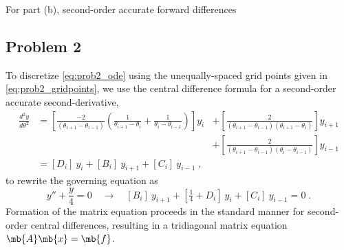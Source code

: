 \documentclass[11pt]{article}
\begin{document}
For part (b), second-order accurate forward differences

\subsection{Problem 2}

To discretize \eqref{eq:prob2_ode} using the unequally-spaced grid points given in \eqref{eq:prob2_gridpoints}, we use the central difference formula for a second-order accurate second-derivative,
\begin{equation}
\begin{aligned}
\frac{d^2 y}{d \theta^2}
&=
\left[
\frac{-2}{(\theta_{i+1} - \theta_{i-1})}
\left(
\frac{1}{\theta_{i+1} - \theta_i}
+
\frac{1}{\theta_i - \theta_{i-1}}
\right)
\right] y_i
\!\!\!\!
&+\left[
\frac{2}{(\theta_{i+1} - \theta_{i-1})(\theta_{i+1} - \theta_{i})}
\right] y_{i+1}
\\
&&+\left[
\frac{2}{(\theta_{i+1} - \theta_{i-1})(\theta_i - \theta_{i-1})}
\right] y_{i-1}
\\
&=
[D_i] \: y_i + [B_i] \: y_{i+1} + [C_i] \: y_{i-1}
\;,
\end{aligned}
\end{equation}
to rewrite the governing equation as
\begin{equation}
y'' + \frac{y}{4} = 0
\quad \rightarrow \quad
[B_i] \: y_{i+1} + [\tfrac{1}{4} + D_i] \: y_i + [C_i] \: y_{i-1} = 0
\;.
\end{equation}
Formation of the matrix equation proceeds in the standard manner for second-order central differences, resulting in a tridiagonal matrix equation $\mb{A} \mb{x} = \mb{f}$.
\end{document}
